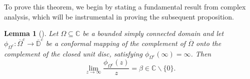 \documentclass{amsbook}
\newtheorem{lemma}[theorem]{Lemma}
\theoremstyle{definition}
\theoremstyle{remark}
\numberwithin{section}{chapter}
\numberwithin{equation}{chapter}
\newcommand{\1}{\mathbf{1}}
\begin{document}
To prove this theorem, we begin by stating a fundamental result from complex analysis, which will be instrumental in proving the subsequent proposition.
\begin{lemma}[{\cite[Lemma 29]{EI2020}}]\label{con-map-2}
Let $\Omega \subseteq \mathbb{C}$ be a bounded simply connected domain and let $\phi_{\Omega^{c}}: \overline{\Omega}^{c} \rightarrow \overline{\mathbb{D}}^{c}$  be  a conformal mapping of the complement of $\overline{\Omega}$ onto the complement of the closed unit disc,  satisfying $\phi_{\Omega^{c}}(\infty)=\infty$. Then
\begin{equation*}
\lim _{z \rightarrow \infty} \frac{\phi_{\Omega^{c}}(z)}{z}=\beta \in \mathbb{C} \backslash\{0\}. 
\end{equation*}
\end{lemma}
\end{document}

